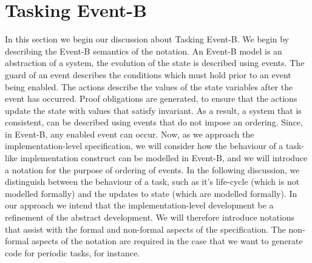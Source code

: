\section{Tasking Event-B}\label{TEB}
In this section we begin our discussion about Tasking Event-B. We begin by describing the Event-B semantics of the notation. An Event-B model is an abstraction of a system, the evolution of the state is described using events. The guard of an event describes the conditions which must hold prior to an event being enabled. The actions describe the values of the state variables after the event has occurred. Proof obligations are generated, to ensure that the actions update the state with values that satisfy invariant. As a result, a system that is consistent, can be described using events that do not impose an ordering. Since, in Event-B, any enabled event can occur. Now, as we approach the implementation-level specification, we will consider how the behaviour of a task-like implementation construct can be modelled in Event-B, and we will introduce a notation for the purpose of ordering of events. In the following discussion, we distinguish between the behaviour of a task, such as it's life-cycle (which is not modelled formally) and the updates to state (which are modelled formally). In our approach we intend that the implementation-level development be a refinement of the abstract development. We will therefore introduce notations that assist with the formal and non-formal aspects of the specification. The non-formal aspects of the notation are required in the case that we want to generate code for periodic tasks, for instance. 

